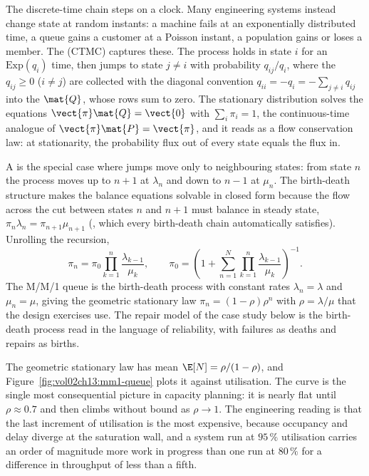 The discrete-time chain steps on a clock. Many engineering systems
instead change state at random instants: a machine fails at an
exponentially distributed time, a queue gains a customer at a Poisson
instant, a population gains or loses a member. The
 (CTMC) captures these. The
process holds in state $i$ for an $\mathrm{Exp}(q_{i})$ time, then jumps
to state $j \neq i$ with probability $q_{ij}/q_{i}$, where the
 $q_{ij} \geq 0$ ($i \neq j$) are collected
with the diagonal convention $q_{ii} = -q_{i} = -\sum_{j \neq i} q_{ij}$
into the  $\mat{Q}$, whose rows sum to zero.
The stationary distribution solves the 
equations $\vect{\pi}\mat{Q} = \vect{0}$ with $\sum_{i}\pi_{i} = 1$, the
continuous-time analogue of $\vect{\pi}\mat{P} = \vect{\pi}$, and it
reads as a flow conservation law: at stationarity, the probability flux
out of every state equals the flux in.

A  is the special case where jumps move only
to neighbouring states: from state $n$ the process moves up to $n + 1$
at  $\lambda_{n}$ and down to $n - 1$ at
 $\mu_{n}$. The birth-death structure makes the
balance equations solvable in closed form because the flow across the
cut between states $n$ and $n + 1$ must balance in steady state,
$\pi_{n}\lambda_{n} = \pi_{n+1}\mu_{n+1}$ (,
which every birth-death chain automatically satisfies). Unrolling the
recursion,
\[
\pi_{n} = \pi_{0}\prod_{k=1}^{n} \frac{\lambda_{k-1}}{\mu_{k}},
\qquad
\pi_{0} = \left(1 + \sum_{n=1}^{N}\prod_{k=1}^{n}
\frac{\lambda_{k-1}}{\mu_{k}}\right)^{-1}.
\]
The M/M/1 queue is the birth-death process with constant rates
$\lambda_{n} = \lambda$ and $\mu_{n} = \mu$, giving the geometric
stationary law $\pi_{n} = (1 - \rho)\rho^{n}$ with $\rho = \lambda/\mu$
that the design exercises use. The repair model of the case study below
is the birth-death process read in the language of reliability, with
failures as deaths and repairs as births.



The geometric stationary law has mean $\E[N] = \rho/(1 - \rho)$, and
Figure~\ref{fig:vol02ch13:mm1-queue} plots it against utilisation. The
curve is the single most consequential picture in capacity planning: it
is nearly flat until $\rho \approx 0.7$ and then climbs without bound as
$\rho \to 1$. The engineering reading is that the last increment of
utilisation is the most expensive, because occupancy and delay diverge
at the saturation wall, and a system run at $95\,\%$ utilisation carries
an order of magnitude more work in progress than one run at $80\,\%$ for
a difference in throughput of less than a fifth.

